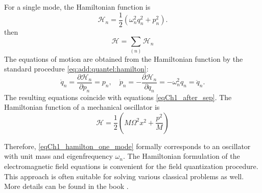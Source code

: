 For a single mode, the Hamiltonian function is  
\begin{equation}
\mathcal{H}_n = \frac{1}{2}\left(\omega_n^2 q_n^2 + p_n^2\right).
\label{eqCh1_hamilton_one_mode}
\end{equation}
then
\begin{equation}
\mathcal{H} = \sum_{(n)} \mathcal{H}_n
\label{eqCh1_hamilton_sum_mode}
\end{equation}
The equations of motion are obtained from the Hamiltonian function by the standard procedure
\eqref{eq:add:quantel:hamilton}:
\begin{equation}
\dot{q}_n = \frac{\partial \mathcal{H}_n}{\partial p_n} = p_n,
\quad
\dot{p}_n = - \frac{\partial \mathcal{H}_n}{\partial q_n} =
- \omega_n^2 q_n = \ddot{q}_n.
\end{equation}
The resulting equations coincide with equations \eqref{eqCh1_after_sep}.  
The Hamiltonian function of a mechanical oscillator is
\[
\mathcal{H} = \frac{1}{2}\left(M \Omega^2 x^2 + \frac{p^2}{M}\right)
\]

Therefore, \eqref{eqCh1_hamilton_one_mode} formally corresponds
to an oscillator with unit mass and eigenfrequency $\omega_n$.
The Hamiltonian formulation of the electromagnetic field equations
is convenient for the field quantization procedure. This
approach is often suitable for solving various classical
problems as well. More details can be found in the book
\cite{bCh1Quantel_Gin}.  

